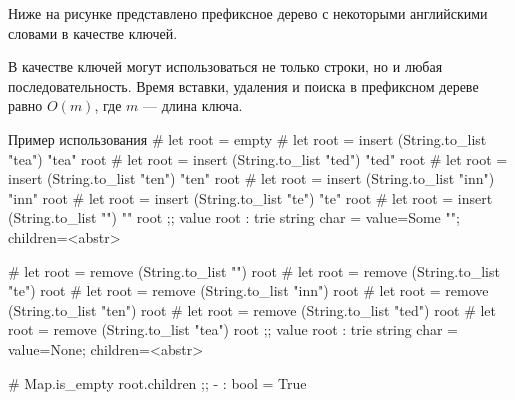 Ниже на рисунке представлено префиксное дерево с некоторыми английскими словами в качестве ключей.
\begin{center}
\end{center}

В качестве ключей могут использоваться не только строки, но и любая последовательность. Время вставки, удаления и поиска в префиксном дереве равно $O(m)$, где $m$ — длина ключа.



\begin{ocamllst}{Пример использования}{}
# let root = empty
# let root = insert (String.to_list "tea") "tea" root
# let root = insert (String.to_list "ted") "ted" root
# let root = insert (String.to_list "ten") "ten" root
# let root = insert (String.to_list "inn") "inn" root
# let root = insert (String.to_list "te") "te" root
# let root = insert (String.to_list "") "" root ;;
value root : trie string char = {value=Some ""; children=<abstr>}

# let root = remove (String.to_list "") root
# let root = remove (String.to_list "te") root
# let root = remove (String.to_list "inn") root
# let root = remove (String.to_list "ten") root
# let root = remove (String.to_list "ted") root
# let root = remove (String.to_list "tea") root ;;
value root : trie string char = {value=None; children=<abstr>}

# Map.is_empty root.children ;;
- : bool = True
\end{ocamllst}

